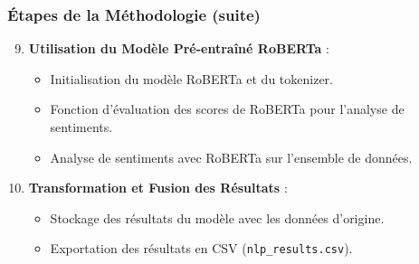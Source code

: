 \begin{frame}
    \frametitle{Étapes de la Méthodologie (suite)}

    \begin{enumerate}
        \setcounter{enumi}{8}
        \item \textbf{Utilisation du Modèle Pré-entraîné RoBERTa} :
            \begin{itemize}
                \item Initialisation du modèle RoBERTa et du tokenizer.
                \item Fonction d'évaluation des scores de RoBERTa pour l'analyse de sentiments.
                \item Analyse de sentiments avec RoBERTa sur l'ensemble de données.
            \end{itemize}
        \item \textbf{Transformation et Fusion des Résultats} :
            \begin{itemize}
                \item Stockage des résultats du modèle avec les données d'origine.
                \item Exportation des résultats en CSV (\texttt{nlp\_results.csv}).
            \end{itemize}
    \end{enumerate}
\end{frame}
